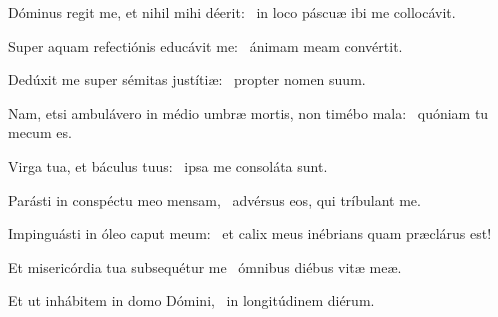 \item Dóminus regit me, et nihil mihi déerit:~\psstar{} in loco páscuæ ibi me collocávit.

\item Super aquam refectiónis educávit me:~\psstar{} ánimam meam convértit.

\item Dedúxit me super sémitas justítiæ:~\psstar{} propter nomen suum.

\item Nam, etsi ambulávero in médio umbræ mortis, non timébo mala:~\psstar{} quóniam tu mecum es.

\item Virga tua, et báculus tuus:~\psstar{} ipsa me consoláta sunt.

\item Parásti in conspéctu meo mensam,~\psstar{} advérsus eos, qui tríbulant me.

\item Impinguásti in óleo caput meum:~\psstar{} et calix meus inébrians quam præclárus est!

\item Et misericórdia tua subsequétur me~\psstar{} ómnibus diébus vitæ meæ.

\item Et ut inhábitem in domo Dómini,~\psstar{} in longitúdinem diérum.

